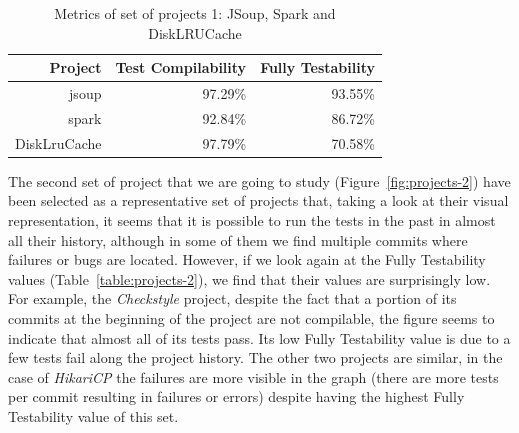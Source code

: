 \begin{figure}[!htb]
\begin{minipage}{.5\textwidth}
        \label{fig:disklrucache}
    \end{minipage}%
\end{figure}

\begin{table}[h!]
    \centering
    \begin{tabular}{|r|r|r|}
    \hline
    \textbf{Project} & \textbf{Test Compilability} & \textbf{Fully Testability} \\ \hline
    jsoup            & 97.29\%                      & 93.55\%                      \\ \hline
    spark            & 92.84\%                      & 86.72\%                      \\ \hline
    DiskLruCache     & 97.79\%                      & 70.58\%                      \\ \hline
    \end{tabular}
    \caption{Metrics of set of projects 1: JSoup, Spark and DiskLRUCache}
    \label{table:projects-1}
\end{table}


The second set of project that we are going to study (Figure~\ref{fig:projects-2}) have been selected as a representative set of projects that, taking a look at their visual representation, it seems that it is possible to run the tests in the past in almost all their history, although in some of them we find multiple commits where failures or bugs are located.
However, if we look again at the Fully Testability values (Table~\ref{table:projects-2}), we find that their values are surprisingly low. 
For example, the \textit{Checkstyle} project, despite the fact that a portion of its commits at the beginning of the project are not compilable, the figure seems to indicate that almost all of its tests pass. 
Its low Fully Testability value is due to a few tests fail along the project history.
The other two projects are similar, in the case of \textit{HikariCP} the failures are more visible in the graph (there are more tests per commit resulting in failures or errors) despite having the highest Fully Testability value of this set.

